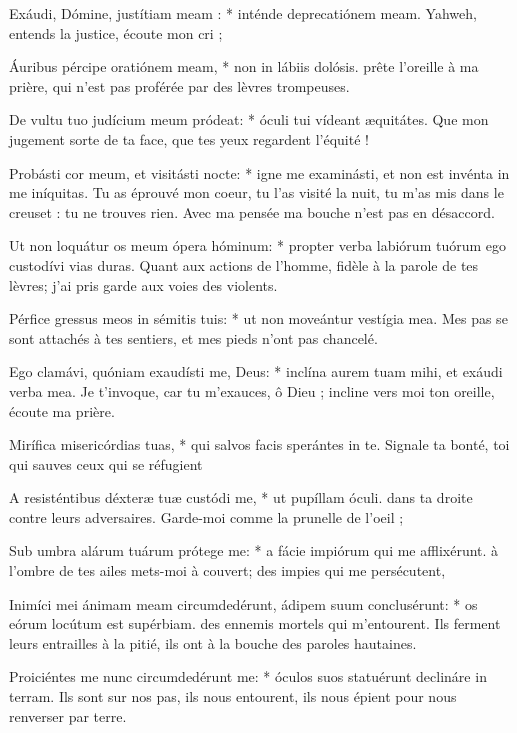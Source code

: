 \begin{paracol}{2}

\LigneParacol
{Exáudi, Dómine, justítiam meam : * inténde deprecatiónem meam.}
{Yahweh, entends la justice, écoute mon cri ;}

\LigneParacol
{Áuribus pércipe oratiónem meam, * non in lábiis dolósis.}
{prête l'oreille à ma prière, qui n'est pas proférée par des lèvres trompeuses. }

\LigneParacol
{De vultu tuo judícium meum pródeat: * óculi tui vídeant æquitátes.}
{Que mon jugement sorte de ta face, que tes yeux regardent l'équité ! }

\LigneParacol
{Probásti cor meum, et visitásti nocte: * igne me examinásti, et non est invénta in me iníquitas.}
{Tu as éprouvé mon coeur, tu l'as visité la nuit, tu m'as mis dans le creuset : tu ne trouves rien. Avec ma pensée ma bouche n'est pas en désaccord. }

\LigneParacol
{Ut non loquátur os meum ópera hóminum: * propter verba labiórum tuórum ego custodívi vias duras.}
{Quant aux actions de l'homme, fidèle à la parole de tes lèvres; j'ai pris garde aux voies des violents. }

\LigneParacol
{Pérfice gressus meos in sémitis tuis: * ut non moveántur vestígia mea.}
{Mes pas se sont attachés à tes sentiers, et mes pieds n'ont pas chancelé. }

\LigneParacol
{Ego clamávi, quóniam exaudísti me, Deus: * inclína aurem tuam mihi, et exáudi verba mea.}
{Je t'invoque, car tu m'exauces, ô Dieu ; incline vers moi ton oreille, écoute ma prière. }

\LigneParacol
{Mirífica misericórdias tuas, * qui salvos facis sperántes in te.}
{Signale ta bonté, toi qui sauves ceux qui se réfugient}

\LigneParacol
{A resisténtibus déxteræ tuæ custódi me, * ut pupíllam óculi.}
{dans ta droite contre leurs adversaires. Garde-moi comme la prunelle de l'oeil ;}

\LigneParacol
{Sub umbra alárum tuárum prótege me: * a fácie impiórum qui me afflixérunt.}
{à l'ombre de tes ailes mets-moi à couvert; des impies qui me persécutent,}

\LigneParacol
{Inimíci mei ánimam meam circumdedérunt, ádipem suum conclusérunt: * os eórum locútum est supérbiam.}
{des ennemis mortels qui m'entourent. Ils ferment leurs entrailles à la pitié, ils ont à la bouche des paroles hautaines. }

\LigneParacol
{Proiciéntes me nunc circumdedérunt me: * óculos suos statuérunt declináre in terram.}
{Ils sont sur nos pas, ils nous entourent, ils nous épient pour nous renverser par terre. }


\end{paracol}
